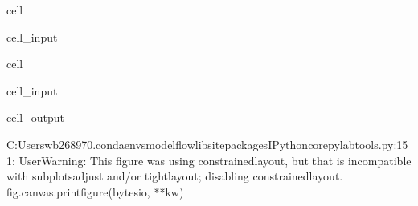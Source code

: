 \documentclass[letterpaper,10pt,english]{jupyterBook}
\begin{document}
\begin{sphinxuseclass}{cell}\begin{sphinxVerbatimInput}

\begin{sphinxuseclass}{cell_input}
\begin{sphinxVerbatim}[commandchars=\\\{\}]
   
\end{sphinxVerbatim}

\end{sphinxuseclass}\end{sphinxVerbatimInput}

\end{sphinxuseclass}
\begin{sphinxuseclass}{cell}\begin{sphinxVerbatimInput}

\begin{sphinxuseclass}{cell_input}
\begin{sphinxVerbatim}[commandchars=\\\{\}]
\PYG{p}{[}\PYG{p}{]}
\end{sphinxVerbatim}

\end{sphinxuseclass}\end{sphinxVerbatimInput}
\begin{sphinxVerbatimOutput}

\begin{sphinxuseclass}{cell_output}
\begin{sphinxVerbatim}[commandchars=\\\{\}]
C:\PYGZbs{}Users\PYGZbs{}wb268970\PYGZbs{}.conda\PYGZbs{}envs\PYGZbs{}modelflow\PYGZbs{}lib\PYGZbs{}site\PYGZhy{}packages\PYGZbs{}IPython\PYGZbs{}core\PYGZbs{}pylabtools.py:151: UserWarning: This figure was using constrained\PYGZus{}layout, but that is incompatible with subplots\PYGZus{}adjust and/or tight\PYGZus{}layout; disabling constrained\PYGZus{}layout.
  fig.canvas.print\PYGZus{}figure(bytes\PYGZus{}io, **kw)
\end{sphinxVerbatim}

\noindent{}

\end{sphinxuseclass}\end{sphinxVerbatimOutput}

\end{sphinxuseclass}
\end{document}
